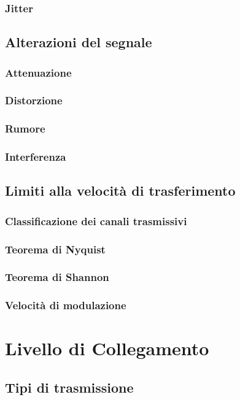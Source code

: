 \documentclass[a4paper,11pt]{paper}
\begin{document}
\subsubsection{Jitter}

\subsection{Alterazioni del segnale}
\subsubsection{Attenuazione}
\subsubsection{Distorzione}
\subsubsection{Rumore}
\subsubsection{Interferenza}

\subsection{Limiti alla velocità di trasferimento}
\subsubsection{Classificazione dei canali trasmissivi}
\subsubsection{Teorema di Nyquist}
\subsubsection{Teorema di Shannon}
\subsubsection{Velocità di modulazione}

\newpage
\section{Livello di Collegamento}

\subsection{Tipi di trasmissione}
\end{document}
